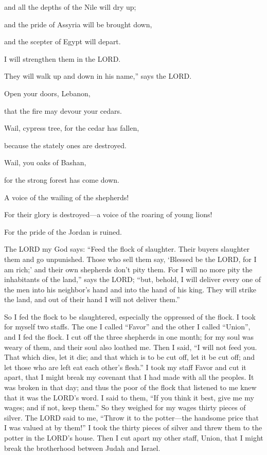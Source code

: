 and all the depths of the Nile will dry up;

and the pride of Assyria will be brought down,

and the scepter of Egypt will depart.

\myverse{}I will strengthen them in the LORD.

They will walk up and down in his name,” says the LORD.


\mychapter{} \myverse*{}Open your doors, Lebanon,

\quad\quad that the fire may devour your cedars.

\myverse{}Wail, cypress tree, for the cedar has fallen,

because the stately ones are destroyed.

Wail, you oaks of Bashan,

for the strong forest has come down.

\myverse{}A voice of the wailing of the shepherds!

For their glory is destroyed—a voice of the roaring of young lions!

For the pride of the Jordan is ruined.

\myverse{}The LORD my God says: “Feed the flock of slaughter.
\myverse{}Their buyers slaughter them and go unpunished. Those who sell them say, ‘Blessed
be the LORD, for I am rich;’ and their own shepherds don’t pity them.
\myverse{}For I will no more pity the inhabitants of the land,” says the LORD; “but,
behold, I will deliver every one of the men into his neighbor’s hand and into the hand of his king. They
will strike the land, and out of their hand I will not deliver them.”

\myverse{}So I fed the flock to be slaughtered, especially the oppressed
of the flock. I took for myself two staffs. The one I called “Favor” and the other I called “Union”, and
I fed the flock.
\myverse{}I cut off the three shepherds in one month; for my soul was weary of them,
and their soul also loathed me.
\myverse{}Then I said, “I will not feed you. That which dies, let it die; and that which
is to be cut off, let it be cut off; and let those who are left eat each other’s flesh.”
\myverse{}I took my staff Favor and cut it apart, that I might break my covenant that
I had made with all the peoples.
\myverse{}It was broken in that day; and thus the poor of the flock that listened to
me knew that it was the LORD’s word.
\myverse{}I said to them, “If you think it best, give me my wages; and if not, keep
them.” So they weighed for my wages thirty pieces of silver.
\myverse{}The LORD said to me, “Throw it to the potter—the handsome price that I was
valued at by them!” I took the thirty pieces of silver and threw them to the potter in the LORD’s house.
\myverse{}Then I cut apart my other staff, Union, that I might break the brotherhood
between Judah and Israel.

